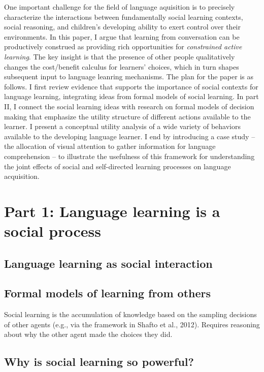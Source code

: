 \documentclass[a4paper,man,apacite,floatsintext]{apa6}
\begin{document}
One important challenge for the field of language aquisition is to
precisely characterize the interactions between fundamentally social
learning contexts, social reasoning, and children's developing ability
to exert control over their environments. In this paper, I argue that
learning from conversation can be productively construed as providing
rich opportunities for \emph{constrained active learning}. The key
insight is that the presence of other people qualitatively changes the
cost/benefit calculus for learners' choices, which in turn shapes
subsequent input to language leanring mechanisms. The plan for the paper
is as follows. I first review evidence that supports the importance of
social contexts for language learning, integrating ideas from formal
models of social learning. In part II, I connect the social learning
ideas with research on formal models of decision making that emphasize
the utility structure of different actions available to the learner. I
present a conceptual utility analysis of a wide variety of behaviors
available to the developing language learner. I end by introducing a
case study -- the allocation of visual attention to gather information
for language comprehension -- to illustrate the usefulness of this
framework for understanding the joint effects of social and
self-directed learning processes on language acquisition.

\section{Part 1: Language learning is a social
process}\label{part-1-language-learning-is-a-social-process}

\subsection{Language learning as social
interaction}\label{language-learning-as-social-interaction}

\subsection{Formal models of learning from
others}\label{formal-models-of-learning-from-others}

Social learning is the accumulation of knowledge based on the sampling
decisions of other agents (e.g., via the framework in Shafto et al.,
2012). Requires reasoning about why the other agent made the choices
they did.

\subsection{Why is social learning so
powerful?}\label{why-is-social-learning-so-powerful}
\end{document}
